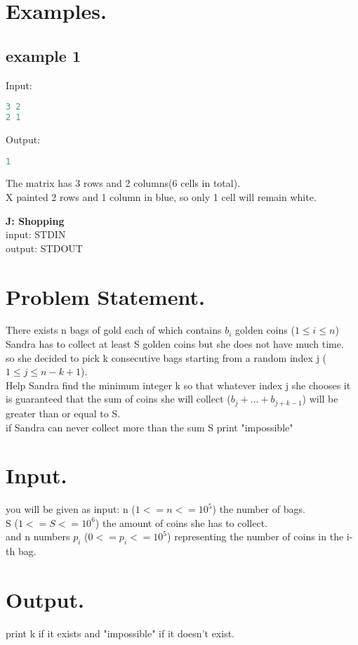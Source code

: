\documentclass[10pt]{article}
\begin{document}
\section{Examples.}
\subsection{example 1}
Input:
\begin{lstlisting}[language=Python]
3 2
2 1
\end{lstlisting}
Output:
\begin{lstlisting}[language=Python]
1
\end{lstlisting}
The matrix has 3 rows and 2 columns(6 cells in total).\\
X painted 2 rows and 1 column in blue, so only 1 cell will remain white.
\newpage
\begin{center}
    \Huge { \textbf{J: Shopping}}\\
\normalsize  { input:  STDIN}\\
\normalsize{    output: STDOUT}
\end{center}
\section{Problem Statement.}
There exists n bags of gold each of which contains $b_i$ golden coins ($1 \le i \le
 n$) Sandra has to collect at least S golden coins but she does not have much
 time.\\
 so she decided to pick k consecutive bags starting from a random index j
 ($1 \le j \le n - k +1$).\\
 Help Sandra find the minimum integer k so that whatever index j she chooses it is guaranteed that the sum of coins she will collect ($b_j
 + ... + b_{j+k-1}$) will be greater than or equal to S.\\
 if Sandra can never collect more than the sum S print "impossible"
\section{Input.}
you will be given as input:
n ($1<=n<=10^5$) the number of bags.\\
S ($1<=S<=10^6$) the amount of coins she has to collect.\\
and n numbers $p_i$ ($0<=p_i<=10^5$) representing the number of coins in the i-th bag.
\section{Output.}
print k if it exists and "impossible" if it doesn't exist.
\end{document}
